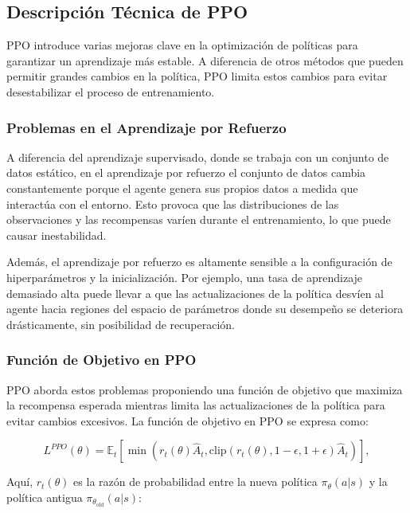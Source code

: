 \documentclass[a4paper,12pt, twoside]{report}
\begin{document}
\subsection{Descripción Técnica de PPO}

PPO introduce varias mejoras clave en la optimización de políticas para garantizar un 
aprendizaje más estable. A diferencia de otros métodos que pueden permitir grandes cambios 
en la política, PPO limita estos cambios para evitar desestabilizar el proceso de entrenamiento.

\subsubsection{Problemas en el Aprendizaje por Refuerzo}

A diferencia del aprendizaje supervisado, donde se trabaja con un conjunto de datos estático, 
en el aprendizaje por refuerzo el conjunto de datos cambia constantemente porque el agente 
genera sus propios datos a medida que interactúa con el entorno. Esto provoca que las 
distribuciones de las observaciones y las recompensas varíen durante el entrenamiento, 
lo que puede causar inestabilidad.

Además, el aprendizaje por refuerzo es altamente sensible a la configuración de hiperparámetros 
y la inicialización. Por ejemplo, una tasa de aprendizaje demasiado alta puede llevar a que 
las actualizaciones de la política desvíen al agente hacia regiones del espacio de parámetros 
donde su desempeño se deteriora drásticamente, sin posibilidad de recuperación.

\subsubsection{Función de Objetivo en PPO}

PPO aborda estos problemas proponiendo una función de objetivo que maximiza la recompensa 
esperada mientras limita las actualizaciones de la política para evitar cambios excesivos. 
La función de objetivo en PPO se expresa como:

\begin{equation}
L^{PPO}(\theta) = \mathbb{E}_t \left[ \min\left(r_t(\theta) \hat{A}_t, \text{clip}(r_t(\theta), 1 - \epsilon, 1 + \epsilon) \hat{A}_t \right) \right],
\end{equation}

Aquí, \( r_t(\theta) \) es la razón de probabilidad entre la nueva política \(\pi_\theta(a|s)\) 
y la política antigua \(\pi_{\theta_{\text{old}}}(a|s)\):
\end{document}
